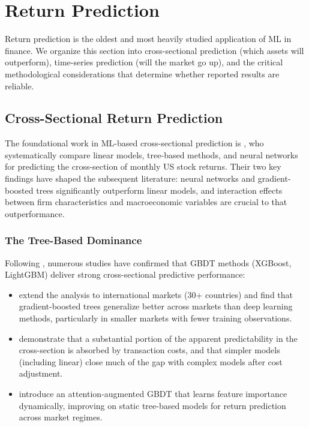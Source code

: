 \section{Return Prediction}\label{sec:return_prediction}

Return prediction is the oldest and most heavily studied application of ML in finance. We organize this section into cross-sectional prediction (which assets will outperform), time-series prediction (will the market go up), and the critical methodological considerations that determine whether reported results are reliable.

\subsection{Cross-Sectional Return Prediction}

The foundational work in ML-based cross-sectional prediction is \citet{Gu2020}, who systematically compare linear models, tree-based methods, and neural networks for predicting the cross-section of monthly US stock returns. Their two key findings have shaped the subsequent literature: neural networks and gradient-boosted trees significantly outperform linear models, and interaction effects between firm characteristics and macroeconomic variables are crucial to that outperformance.

\subsubsection{The Tree-Based Dominance}

Following \citet{Gu2020}, numerous studies have confirmed that GBDT methods (XGBoost, LightGBM) deliver strong cross-sectional predictive performance:

\begin{itemize}[leftmargin=*]
    \item \citet{Leippold2022} extend the analysis to international markets (30+ countries) and find that gradient-boosted trees generalize better across markets than deep learning methods, particularly in smaller markets with fewer training observations.

    \item \citet{Tobek2021} demonstrate that a substantial portion of the apparent predictability in the cross-section is absorbed by transaction costs, and that simpler models (including linear) close much of the gap with complex models after cost adjustment.

    \item \citet{Chen2024} introduce an attention-augmented GBDT that learns feature importance dynamically, improving on static tree-based models for return prediction across market regimes.
\end{itemize}

